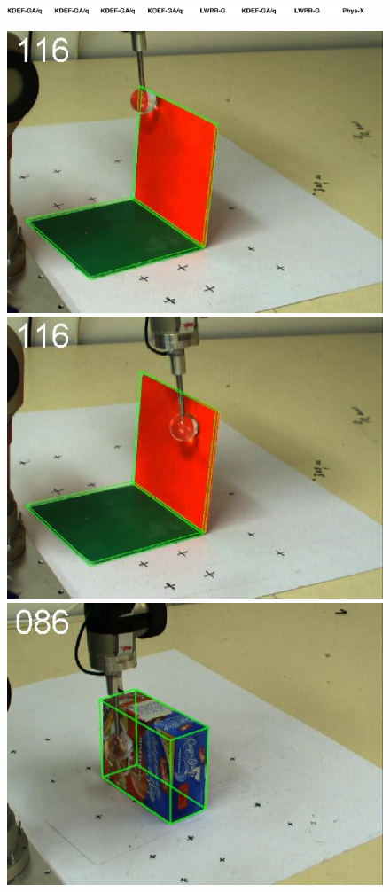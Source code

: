 \newlength{\imgAXwid}
\setlength{\imgAXwid}{2.07cm}

\begin{figure}[htbp]
\centerline{
\includegraphics[width=0.95\textwidth]{fig13-conditions}
}
\centerline{
\includegraphics[width=\imgAXwid]{./A1_2exp_667_1}
\includegraphics[width=\imgAXwid]{./A1_2exp_876_1}
\includegraphics[width=\imgAXwid]{./A2_2exp_399_1}
}
\end{figure}
